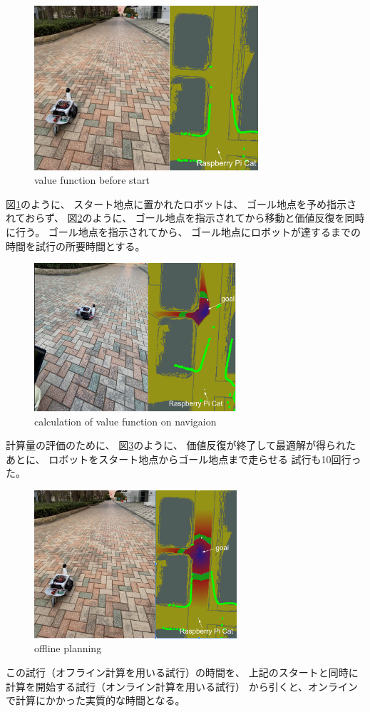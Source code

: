 \documentclass{jarticle}
\begin{document}
\begin{figure}[htb]
  \centering
   \includegraphics[height=61mm]{./figs/raspicat-start.png}
   \caption{value function before start}
	\label{fig:raspicat-start}
\end{figure}

図\ref{fig:raspicat-start}のように、
スタート地点に置かれたロボットは、
ゴール地点を予め指示されておらず、
図\ref{fig:raspicat-no-local}のように、
ゴール地点を指示されてから移動と価値反復を同時に行う。
ゴール地点を指示されてから、
ゴール地点にロボットが達するまでの時間を試行の所要時間とする。

\begin{figure}[htb]
  \centering
   \includegraphics[height=55mm]{./figs/raspicat-no-local.png}
   \caption{calculation of value function on navigaion}
	\label{fig:raspicat-no-local}
\end{figure}

計算量の評価のために、
図\ref{fig:raspicat-after-planning}のように、
価値反復が終了して最適解が得られたあとに、
ロボットをスタート地点からゴール地点まで走らせる
試行も10回行った。
\begin{figure}[htb]
  \centering
   \includegraphics[height=55mm]{./figs/raspicat-after-planning.png}
   \caption{offline planning}
	\label{fig:raspicat-after-planning}
\end{figure}
この試行（オフライン計算を用いる試行）の時間を、
上記のスタートと同時に計算を開始する試行（オンライン計算を用いる試行）
から引くと、オンラインで計算にかかった実質的な時間となる。
\end{document}
